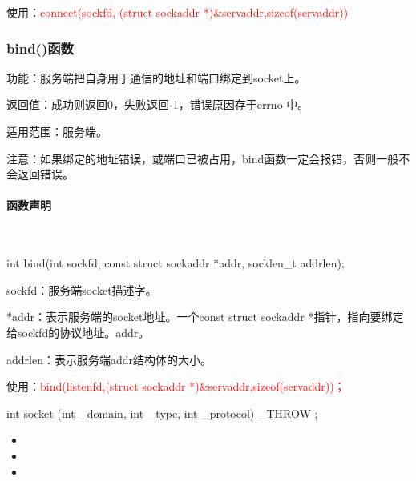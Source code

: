 \documentclass[UTF8]{article}%
\begin{document}
使用：\textcolor{red}{connect(sockfd, (struct sockaddr *)\&servaddr,sizeof(servaddr))}

\subsubsection{bind()函数}

功能：服务端把自身用于通信的地址和端口绑定到socket上。

返回值：成功则返回0，失败返回-1，错误原因存于errno 中。

适用范围：服务端。

注意：如果绑定的地址错误，或端口已被占用，bind函数一定会报错，否则一般不会返回错误。

\paragraph{函数声明}~{}

int bind(int sockfd, const struct sockaddr *addr, socklen\_t addrlen);

sockfd：服务端socket描述字。

*addr：表示服务端的socket地址。一个const struct sockaddr *指针，指向要绑定给sockfd的协议地址。addr。

addrlen：表示服务端addr结构体的大小。

使用：\textcolor{red}{bind(listenfd,(struct sockaddr *)\&servaddr,sizeof(servaddr))；}



int socket (int \_domain, int \_type, int \_protocol) \_THROW ;





\begin{itemize}
    \item 
    \item 
    \item 
\end{itemize}
\end{document}
